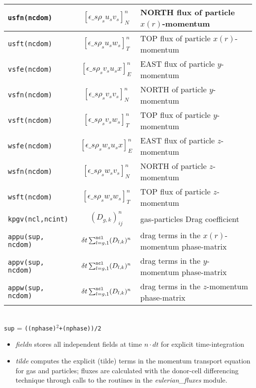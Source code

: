 \begin{tabular}{|p{4cm}|c|p{8cm}|}
\tt usfn(ncdom) & $\left[ \epsilon\_s\rho_s u_s v_s \right]_{N}^n$ & NORTH flux of particle $x(r)$-momentum \\\hline
\tt usft(ncdom) & $\left[ \epsilon\_s\rho_s u_s w_s \right]_{T}^n$ & TOP flux of particle $x(r)$-momentum \\\hline
\tt vsfe(ncdom) & $\left[ \epsilon\_s\rho_s v_s u_s x \right]_{E}^n$ & EAST flux of particle $y$-momentum \\\hline
\tt vsfn(ncdom) & $\left[ \epsilon\_s\rho_s v_s v_s \right]_{N}^n$ & NORTH of particle $y$-momentum \\\hline
\tt vsft(ncdom) & $\left[ \epsilon\_s\rho_s v_s w_s \right]_{T}^n$ & TOP flux of particle $y$-momentum \\\hline
\tt wsfe(ncdom) & $\left[ \epsilon\_s\rho_s w_s u_s x \right]_{E}^n$ & EAST flux of particle $z$-momentum \\\hline
\tt wsfn(ncdom) & $\left[ \epsilon\_s\rho_s w_s v_s \right]_{N}^n$ & NORTH of particle $z$-momentum \\\hline
\tt wsft(ncdom) & $\left[ \epsilon\_s\rho_s w_s w_s \right]_{T}^n$ & TOP flux of particle $z$-momentum \\\hline

\tt kpgv(ncl,ncint) & $(D_{g,k})^n_{ij}$ & gas-particles Drag coefficient\\\hline
\tt appu(sup, ncdom) & $\delta t\sum_{l=g,1}^{\tt ncl}(D_{l,k})^n$ & drag terms in the $x(r)$-momentum phase-matrix\\\hline
\tt appv(sup, ncdom) &  $\delta t\sum_{l=g,1}^{\tt ncl}(D_{l,k})^n$ & drag terms in the $y$-momentum phase-matrix\\\hline
\tt appw(sup, ncdom) &  $\delta t\sum_{l=g,1}^{\tt ncl}(D_{l,k})^n$ & drag terms in the $z$-momentum phase-matrix\\\hline
\end{tabular}\\
{\tt sup} = {\tt ((nphase)$^2$+(nphase))/2}
\begin{itemize}
\item{\em fieldn} stores all independent fields at time $n\cdot dt$ for explicit time-integration
\item{\em tilde} computes the explicit (tilde) terms in the momentum transport equation for gas and particles; fluxes are calculated with the donor-cell differencing technique through calls to the routines in the {\em eulerian\_fluxes} module.
\end{itemize}
%
